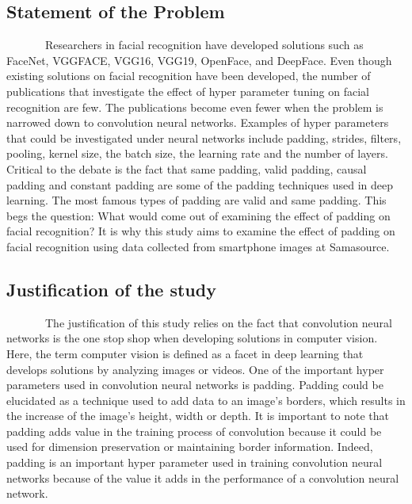 \documentclass[
  12pt,
]{article}
\begin{document}
\subsection{Statement of the Problem}\label{statement-of-the-problem}

~~~~~~~Researchers in facial recognition have developed solutions such
as FaceNet, VGGFACE, VGG16, VGG19, OpenFace, and DeepFace. Even though
existing solutions on facial recognition have been developed, the number
of publications that investigate the effect of hyper parameter tuning on
facial recognition are few. The publications become even fewer when the
problem is narrowed down to convolution neural networks. Examples of
hyper parameters that could be investigated under neural networks
include padding, strides, filters, pooling, kernel size, the batch size,
the learning rate and the number of layers. Critical to the debate is
the fact that same padding, valid padding, causal padding and constant
padding are some of the padding techniques used in deep learning. The
most famous types of padding are valid and same padding. This begs the
question: What would come out of examining the effect of padding on
facial recognition? It is why this study aims to examine the effect of
padding on facial recognition using data collected from smartphone
images at Samasource.

\subsection{Justification of the
study}\label{justification-of-the-study}

~~~~~~~The justification of this study relies on the fact that
convolution neural networks is the one stop shop when developing
solutions in computer vision. Here, the term computer vision is defined
as a facet in deep learning that develops solutions by analyzing images
or videos. One of the important hyper parameters used in convolution
neural networks is padding. Padding could be elucidated as a technique
used to add data to an image's borders, which results in the increase of
the image's height, width or depth. It is important to note that padding
adds value in the training process of convolution because it could be
used for dimension preservation or maintaining border information.
Indeed, padding is an important hyper parameter used in training
convolution neural networks because of the value it adds in the
performance of a convolution neural network.
\end{document}
